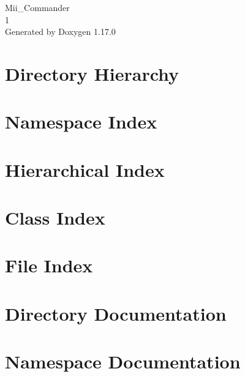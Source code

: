 \documentclass[twoside]{book}
\newcommand{\+}{\discretionary{\mbox{\scriptsize$\hookleftarrow$}}{}{}}
\newcommand{\clearemptydoublepage}{%
    \newpage{\pagestyle{empty}\cleardoublepage}%
  }
\begin{document}
  \raggedbottom
    \hypersetup{pageanchor=false,
                bookmarksnumbered=true,
                pdfencoding=unicode
               }
  \begin{titlepage}
  \vspace*{7cm}
  \begin{center}%
  {\Large Mii\+\_\+\+Commander}\\
  [1ex]\large 1 \\
  \vspace*{1cm}
  {\large Generated by Doxygen 1.17.0}\\
  \end{center}
  \end{titlepage}
  \clearemptydoublepage
  \tableofcontents
  \clearemptydoublepage
  \hypersetup{pageanchor=true}

\chapter{Directory Hierarchy}

\chapter{Namespace Index}

\chapter{Hierarchical Index}

\chapter{Class Index}

\chapter{File Index}

\chapter{Directory Documentation}






\chapter{Namespace Documentation}


\end{document}
